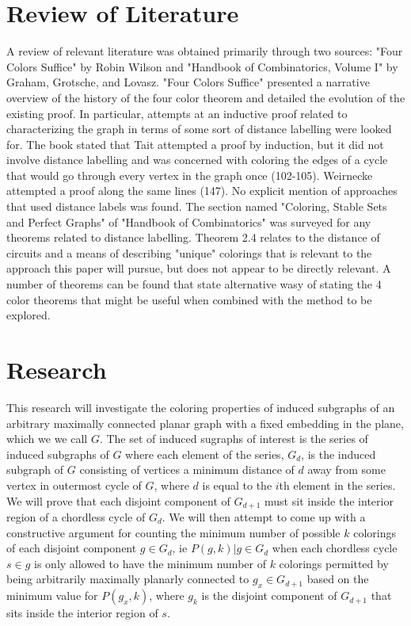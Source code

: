 \documentclass{report}
\theoremstyle{plain}
\theoremstyle{definition}
\begin{document}
\vspace{.75in}
\section*{Review of Literature}

A review of relevant literature was obtained primarily through two sources: "Four Colors Suffice" by Robin Wilson and "Handbook of Combinatorics, Volume I" by Graham, Grotsche, and Lovasz. "Four Colors Suffice" presented a narrative overview of the history of the four color theorem and detailed the evolution of the existing proof. In particular, attempts at an inductive proof related to characterizing the graph in terms of some sort of distance labelling were looked for. The book stated that Tait attempted a proof by induction, but it did not involve distance labelling and was concerned with coloring the edges of a cycle that would go through every vertex in the graph once (102-105). Weirnecke attempted a proof along the same lines (147). No explicit mention of approaches that used distance labels was found. The section named "Coloring, Stable Sets and Perfect Graphs" of "Handbook of Combinatorics" was surveyed for any theorems related to distance labelling. Theorem 2.4 relates to the distance of circuits and a means of describing "unique" colorings that is relevant to the approach this paper will pursue, but does not appear to be directly relevant. A number of theorems can be found that state alternative wasy of stating the 4 color theorems that might be useful when combined with the method to be explored.

\vspace{.75in}
\section*{Research}

This research will investigate the coloring properties of induced subgraphs of an arbitrary maximally connected planar graph with a fixed embedding in the plane, which we we call $G$. The set of induced sugraphs of interest is the series of induced subgraphs of $G$ where each element of the series, $G_d$, is the induced subgraph of $G$ consisting of vertices a minimum distance of $d$ away from some vertex in outermost cycle of $G$, where $d$ is equal to the $i$th element in the series. We will prove that each disjoint component of $G_{d+1}$ must sit inside the interior region of a chordless cycle of $G_d$. We will then attempt to come up with a constructive argument for counting the minimum number of possible $k$ colorings of each disjoint component $g \in G_d$, ie $P(g, k) | g \in G_d$ when each chordless cycle $s \in g$ is only allowed to have the minimum number of $k$ colorings permitted by being arbitrarily maximally planarly connected to $g_x \in G_{d+1}$ based on the minimum value for $P(g_x, k)$, where $g_k$ is the disjoint component of $G_{d+1}$ that sits inside the interior region of $s$.
\end{document}
